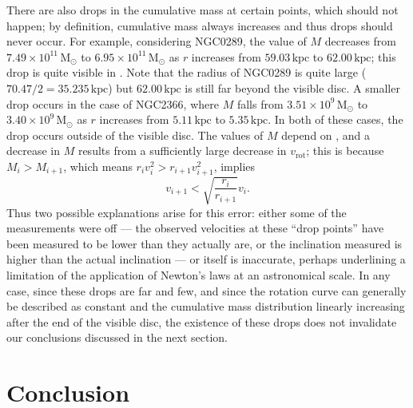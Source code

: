 \documentclass{article}
\newcommand\solmass{\textrm{M}_\odot}
\newcommand\kpc{\textrm{kpc}}
\newcommand\vrot{\ensuremath{v_{\textrm{rot}}}}
\begin{document}
There are also drops in the cumulative mass at certain points, which should not happen; by definition, cumulative mass always increases and thus drops should never occur.
For example, considering NGC0289, the value of \(M\) decreases from \(7.49\times 10^{11}\,\solmass\) to \(6.95\times 10^{11}\,\solmass\) as \(r\) increases from \(59.03\,\kpc\) to \(62.00\,\kpc\); this drop is quite visible in .
Note that the radius of NGC0289 is quite large (\(70.47/2 = 35.235\,\kpc\)) but \(62.00\,\kpc\) is still far beyond the visible disc.
A smaller drop occurs in the case of NGC2366, where \(M\) falls from \(3.51\times 10^9\,\solmass\) to \(3.40\times 10^9\,\solmass\) as \(r\) increases from \(5.11\,\kpc\) to \(5.35\,\kpc\).
In both of these cases, the drop occurs outside of the visible disc.
The values of \(M\) depend on , and a decrease in \(M\) results from a sufficiently large decrease in \(\vrot\); this is because \(M_i > M_{i+1}\), which means \(r_iv_i^2 > r_{i+1}v_{i+1}^2\), implies
\begin{equation}
    v_{i+1} < \sqrt{\frac{r_i}{r_{i+1}}}v_i.
\end{equation}
Thus two possible explanations arise for this error: either some of the measurements were off --- the observed velocities at these ``drop points'' have been measured to be lower than they actually are, or the inclination measured is higher than the actual inclination --- or  itself is inaccurate, perhaps underlining a limitation of the application of Newton's laws at an astronomical scale.
In any case, since these drops are far and few, and since the rotation curve can generally be described as constant and the cumulative mass distribution linearly increasing after the end of the visible disc, the existence of these drops does not invalidate our conclusions discussed in the next section.

\section{Conclusion}\label{sec:conclusion}
\end{document}
